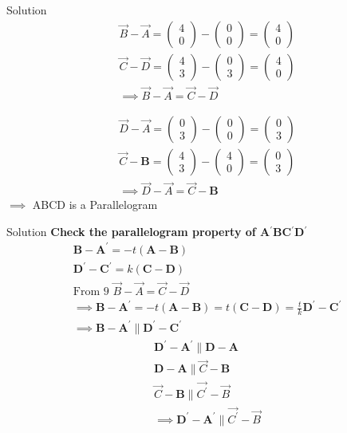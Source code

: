 \documentclass{beamer}
\numberwithin{equation}{section}
\theoremstyle{remark}
\newcommand{\myvec}[1]{\ensuremath{\begin{pmatrix}#1\end{pmatrix}}}
\let\vec\mathbf
\begin{document}
\begin{frame}{Solution}
\begin{align}
    \Vec{B}-\Vec{A}=\myvec{4\\0}-\myvec{0\\0}=\myvec{4\\0}\\
    \Vec{C}-\Vec{D}=\myvec{4\\3}-\myvec{0\\3}=\myvec{4\\0}\\
\implies \Vec{B}-\Vec{A}=\Vec{C}-\Vec{D}
\end{align}

\begin{align}
    \Vec{D}-\Vec{A}=\myvec{0\\3}-\myvec{0\\0}=\myvec{0\\3}\\
    \Vec{C}-\vec{B}=\myvec{4\\3}-\myvec{4\\0}=\myvec{0\\3}\\
\implies   \Vec{D}-\Vec{A}=  \Vec{C}-\vec{B}
\end{align}
$\implies$ ABCD is a Parallelogram\\ 
\end{frame}
\begin{frame}{Solution}
\textbf{Check the parallelogram property of A$^{\prime}$BC$^{\prime}$D$^{\prime}$ }\\
\begin{align}
    \vec{B}-\vec{A^{\prime}}=-t(\vec{A}-\vec{B})\\
    \vec{D^{\prime}}-\vec{C^{\prime}}=k(\vec{C}-\vec{D})\\
    \text{From 9 }\Vec{B}-\Vec{A}=\Vec{C}-\Vec{D}\\
\implies \vec{B}-\vec{A^{\prime}}=-t(\vec{A}-\vec{B})=t(\vec{C}-\vec{D})=\frac{t}{k}\vec{D^{\prime}}-\vec{C^{\prime}}\\
\implies \vec{B}-\vec{A^{\prime}} \parallel \vec{D^{\prime}}-\vec{C^{\prime}}
\end{align}
    \begin{align}
    \vec{D^{\prime}}-\vec{A^{\prime}} \parallel \vec{D}-\vec{A}\\
    \vec{D}-\vec{A} \parallel \Vec{C}-\vec{B}\\
     \Vec{C}-\vec{B} \parallel \Vec{C^{\prime}}-\Vec{B}\\
\implies \vec{D^{\prime}}-\vec{A^{\prime}} \parallel \Vec{C^{\prime}}-\Vec{B}
\end{align}
\end{frame}
\end{document}
